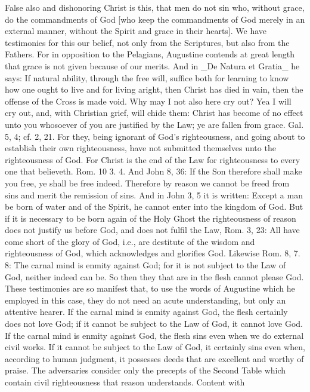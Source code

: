 False also and dishonoring Christ is this, that men do not sin who,
without grace, do the commandments of God [who keep the commandments
of God merely in an external manner, without the Spirit and grace in
their hearts].  We have testimonies for this our belief, not only
from the Scriptures, but also from the Fathers.  For in opposition to
the Pelagians, Augustine contends at great length that grace is not
given because of our merits.  And in _De Natura et Gratia_ he says:
If natural ability, through the free will, suffice both for learning
to know how one ought to live and for living aright, then Christ has
died in vain, then the offense of the Cross is made void.  Why may I
not also here cry out?  Yea I will cry out, and, with Christian grief,
will chide them: Christ has become of no effect unto you whosoever
of you are justified by the Law; ye are fallen from grace.  Gal. 5, 4;
cf. 2, 21. For they, being ignorant of God's righteousness, and
going about to establish their own righteousness, have not submitted
themselves unto the righteousness of God.  For Christ is the end of
the Law for righteousness to every one that believeth.  Rom. 10 3. 4.
And John 8, 36: If the Son therefore shall make you free, ye shall be
free indeed.  Therefore by reason we cannot be freed from sins and
merit the remission of sins.  And in John 3, 5 it is written: Except
a man be born of water and of the Spirit, he cannot enter into the
kingdom of God.  But if it is necessary to be born again of the Holy
Ghost the righteousness of reason does not justify us before God, and
does not fulfil the Law, Rom. 3, 23: All have come short of the glory
of God, i.e., are destitute of the wisdom and righteousness of God,
which acknowledges and glorifies God.  Likewise Rom. 8, 7. 8: The
carnal mind is enmity against God; for it is not subject to the Law
of God, neither indeed can be.  So then they that are in the flesh
cannot please God.  These testimonies are so manifest that, to use
the words of Augustine which he employed in this case, they do not
need an acute understanding, but only an attentive hearer.  If the
carnal mind is enmity against God, the flesh certainly does not love
God; if it cannot be subject to the Law of God, it cannot love God.
If the carnal mind is enmity against God, the flesh sins even when we
do external civil works.  If it cannot be subject to the Law of God,
it certainly sins even when, according to human judgment, it
possesses deeds that are excellent and worthy of praise.  The
adversaries consider only the precepts of the Second Table which
contain civil righteousness that reason understands.  Content with
